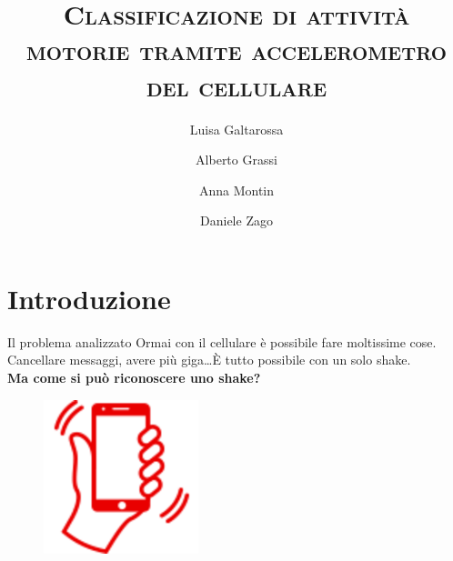 \documentclass{beamer}
\title{\textsc{Classificazione di attività motorie tramite accelerometro del cellulare}}
\author{Luisa Galtarossa\and Alberto Grassi\and Anna Montin\and Daniele Zago}
\date{}
\begin{document}
\begin{frame}
\titlepage
\end{frame}

\section{Introduzione}
\begin{frame}{Il problema analizzato}
Ormai con il cellulare è possibile fare moltissime cose. 
Cancellare messaggi, avere più giga\dots È tutto possibile con un solo shake.\\
\smallskip
\textbf{Ma come si può riconoscere uno shake?}
\medskip
\begin{figure}[H]
\includegraphics[width=0.4\textwidth]{./images/vodafoneshake.png}
\end{figure}
\end{frame}
\end{document}
